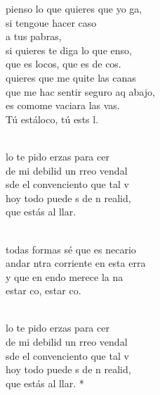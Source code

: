 \documentclass[12pt]{article}
\begin{document}
\begin{multicols*}{2}
\begin{cancion}%
	 pienso lo que quieres que yo ga,\\
	si tengoue hacer caso \\
	a tus pabras,\\
	si quieres te diga lo que enso,\\
	que es  locos, que es de cos.\\
	 quieres que me quite las canas\\
	que me hac sentir seguro aq abajo, \\
	es comome vaciara las vas.\\
	Tú estáloco, tú ests l.\\\jump\\
	\begin{chorus}%
	lo te pido erzas para cer \\
	de mi debilid un rreo vendal\\
	sde el convenciento que tal v\\
	hoy todo puede s de n realid,\\
	que  estás al llar.  \\
	\end{chorus}%
	\jump\\
	 todas formas sé que es necario\\
	andar ntra corriente en esta erra\\
	y que en endo merece la na\\
	estar co, estar co.\\\jump\\
	\begin{chorus}%
	lo te pido erzas para cer \\
	de mi debilid un rreo vendal\\
	sde el convenciento que tal v\\
	hoy todo puede s de n realid,\\
	que  estás al llar. *\\
	\end{chorus}%
	\jump\\
\end{cancion}%


\end{multicols*}
\end{document}
